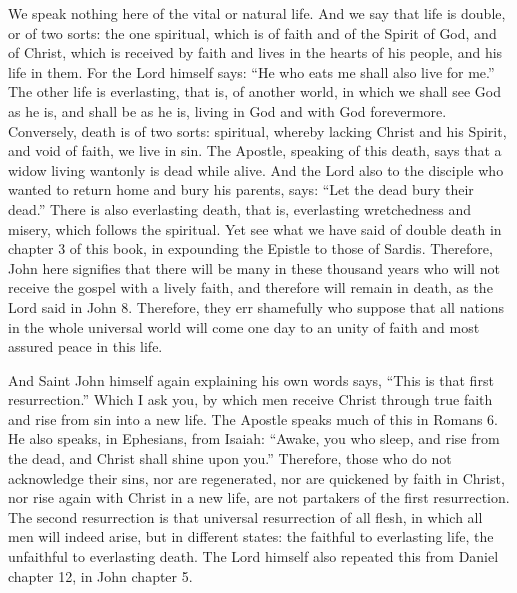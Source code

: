 We speak nothing here of the vital or natural life. And we say that life is double, or of two sorts: the one spiritual, which is of faith and of the Spirit of God, and of Christ, which is received by faith and lives in the hearts of his people, and his life in them. For the Lord himself says: “He who eats me shall also live for me.” The other life is everlasting, that is, of another world, in which we shall see God as he is, and shall be as he is, living in God and with God forevermore. Conversely, death is of two sorts: spiritual, whereby lacking Christ and his Spirit, and void of faith, we live in sin. The Apostle, speaking of this death, says that a widow living wantonly is dead while alive. And the Lord also to the disciple who wanted to return home and bury his parents, says: “Let the dead bury their dead.” There is also everlasting death, that is, everlasting wretchedness and misery, which follows the spiritual. Yet see what we have said of double death in chapter 3 of this book, in expounding the Epistle to those of Sardis. Therefore, John here signifies that there will be many in these thousand years who will not receive the gospel with a lively faith, and therefore will remain in death, as the Lord said in John 8. Therefore, they err shamefully who suppose that all nations in the whole universal world will come one day to an unity of faith and most assured peace in this life.

And Saint John himself again explaining his own words says, “This is that first resurrection.” Which I ask you, by which men receive Christ through true faith and rise from sin into a new life. The Apostle speaks much of this in Romans 6. He also speaks, in Ephesians, from Isaiah: “Awake, you who sleep, and rise from the dead, and Christ shall shine upon you.” Therefore, those who do not acknowledge their sins, nor are regenerated, nor are quickened by faith in Christ, nor rise again with Christ in a new life, are not partakers of the first resurrection. The second resurrection is that universal resurrection of all flesh, in which all men will indeed arise, but in different states: the faithful to everlasting life, the unfaithful to everlasting death. The Lord himself also repeated this from Daniel chapter 12, in John chapter 5.

